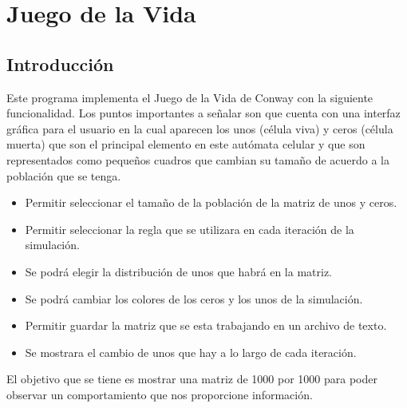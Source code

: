 \section{Juego de la Vida}
\subsection{Introducción}
Este programa implementa el Juego de la Vida de Conway con la siguiente funcionalidad. Los puntos importantes a señalar son que cuenta con una interfaz gráfica para el usuario en la cual aparecen los unos (célula viva) y ceros (célula muerta) que son el principal elemento en este autómata celular y que son representados como pequeños cuadros que cambian su tamaño de acuerdo a la población que se tenga.
\begin{itemize}
 \item Permitir seleccionar el tamaño de la población de la matriz de unos y ceros.
 \item Permitir seleccionar la regla que se utilizara en cada iteración de la simulación.
 \item Se podrá elegir la distribución de unos que habrá en la matriz.
 \item Se podrá cambiar los colores de los ceros y los unos de la simulación.
 \item Permitir guardar la matriz que se esta trabajando en un archivo de texto.
 \item Se mostrara el cambio de unos que hay a lo largo de cada iteración.
\end{itemize}
El objetivo que se tiene es mostrar una matriz de 1000 por 1000 para poder observar un comportamiento que nos proporcione información.

